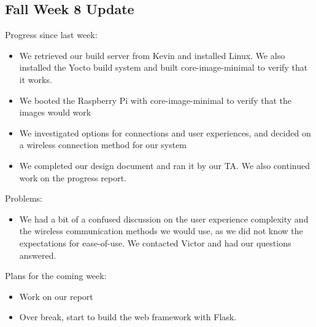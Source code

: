 \subsection{Fall Week 8 Update}
Progress since last week:
\begin{itemize}
   \item We retrieved our build server from Kevin and installed Linux. We also installed the Yocto build system and built core-image-minimal to verify that it works.
   \item We booted the Raspberry Pi with core-image-minimal to verify that the images would work
   \item We investigated options for connections and user experiences, and decided on a wireless connection method for our system
   \item We completed our design document and ran it by our TA. We also continued work on the progress report.
\end{itemize}
Problems:
\begin{itemize}
   \item We had a bit of a confused discussion on the user experience complexity and the wireless communication methods we would use, as we did not know the expectations for ease-of-use. We contacted Victor and had our questions answered.
\end{itemize}
Plans for the coming week:
\begin{itemize}
   \item Work on our report
   \item Over break, start to build the web framework with Flask.
\end{itemize}
